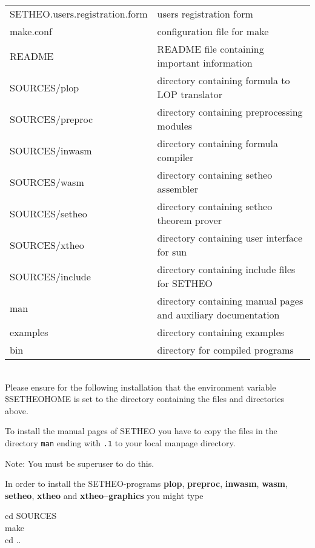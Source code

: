 \begin{tabular}{|l|l|}
\hline
SETHEO.users.registration.form & users registration form \\
make.conf      & configuration file for make \\
README        & README file containing important information \\
SOURCES/plop  & directory containing formula to LOP translator \\
SOURCES/preproc & directory containing preprocessing modules \\
SOURCES/inwasm  & directory containing formula compiler \\
SOURCES/wasm & directory containing setheo assembler \\
SOURCES/setheo & directory containing setheo theorem prover \\
SOURCES/xtheo & directory containing user interface for sun \\
SOURCES/include & directory containing include files for SETHEO \\
man     & directory containing manual pages and auxiliary documentation\\
examples& directory containing examples \\
bin	& directory for compiled programs \\
\hline
\end{tabular}\\[3mm]
Please ensure for the following installation that the environment variable
\$SETHEOHOME is set to the directory containing the files and directories above.




To install the manual pages of SETHEO you have to copy the files
in the directory {\tt man} ending with \verb-.1- to your local manpage 
directory.

Note: You must be superuser to do this. 


In order to install the SETHEO-programs 
{\bf plop},
{\bf preproc},
{\bf inwasm},
{\bf wasm},
{\bf setheo},
{\bf xtheo} and
{\bf xtheo--graphics} you might type

\begin{center}
                cd SOURCES\\
                make \\
		cd ..
\end{center} \vspace{-2mm}

